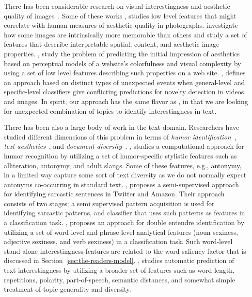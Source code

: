There has been considerable research on visual interestingness and aesthetic quality of images~\cite{Datta:2006:SAP:2129560.2129588,Datta:2008:4233023,Ke:2006:DHF:1153170.1153495,IsolaParikhTorralbaOliva2011,dhar:2011,reinecke2013predicting,journals/pami/WeinshallZHKOABGNPHP12}. Some of these works \cite{Datta:2006:SAP:2129560.2129588,Datta:2008:4233023,Ke:2006:DHF:1153170.1153495,dhar:2011}, studies low level features that might correlate with human measures of aesthetic quality in photographs. \cite{IsolaParikhTorralbaOliva2011} investigate how some images are intrinsically more memorable than others and study a set of features that describe interpretable spatial, content, and aesthetic image properties. \cite{reinecke2013predicting,journals/pami/WeinshallZHKOABGNPHP12},  study the problem of predicting the initial impression of aesthetics
based on perceptual models of a website's colorfulness and visual complexity by using a set of low level features describing such properties on a web site.  
\cite{journals/pami/WeinshallZHKOABGNPHP12}, defines an approach based on distinct types of unexpected events when general-level and specific-level classifiers give conflicting predictions for novelty detection in videos and images. In spirit, our approach has the same flavor as \cite{journals/pami/WeinshallZHKOABGNPHP12},  in that we are looking for unexpected combination of topics to identify interestingness in text.

 
There has been also a large body of work in the text domain. Researchers have studied different dimensions of this problem in terms of {\em humor identification}~\cite{Mihalcea:2005:MCL:1220575.1220642,Davidov:2010:SRS:1870568.1870582,Kiddon11,labutov-lipson:2012:ACL2012short},
{\em text aesthetics}~\cite{journals:tamd:Schmidhuber10,N13-1118,ganguly:2014}, and {\em document diversity}~\cite{bache:2013}.  \cite{Mihalcea:2005:MCL:1220575.1220642}, studies a computational approach for humor recognition by utilizing a set of humor-specific stylistic features such as alliteration, antonymy, and adult slangs. Some of these features, e.g., antonymy, in a limited way capture some sort of text diversity as we do not normally expect antonyms co-occurring in standard text. \cite{Davidov:2010:SRS:1870568.1870582},  proposes a semi-supervised approach for identifying sarcastic sentences
in Twitter and Amazon.  Their approach consists of two stages; a semi supervised pattern acquisition is used for identifying
sarcastic patterns, and classifier that uses such patterns as features in a classification task. \cite{Kiddon11}, proposes an approach for double entendre identification by utilizing  a set of word-level and phrase-level analytical features (noun sexiness, adjective sexiness, and verb sexiness) in a classification task. Such word-level stand-alone interestingness features are related to the word-saliency factor that is discussed in Section~\ref{sec:the-readers-model}. \cite{ganguly:2014}, studies automatic prediction of text interestingness by utilizing a broader set of features such as word length, repetitions, polarity, part-of-speech, semantic distances, and somewhat simple treatment of topic generality and diversity.

